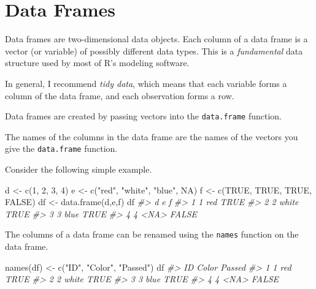 \documentclass[
]{article}
\newenvironment{Shaded}{\begin{snugshade}}{\end{snugshade}}
\newcommand{\CommentTok}[1]{\textcolor[rgb]{0.56,0.35,0.01}{\textit{#1}}}
\newcommand{\ConstantTok}[1]{\textcolor[rgb]{0.00,0.00,0.00}{#1}}
\newcommand{\DecValTok}[1]{\textcolor[rgb]{0.00,0.00,0.81}{#1}}
\newcommand{\FunctionTok}[1]{\textcolor[rgb]{0.00,0.00,0.00}{#1}}
\newcommand{\NormalTok}[1]{#1}
\newcommand{\OtherTok}[1]{\textcolor[rgb]{0.56,0.35,0.01}{#1}}
\newcommand{\StringTok}[1]{\textcolor[rgb]{0.31,0.60,0.02}{#1}}
\begin{document}
\hypertarget{data-frames}{%
\section{Data Frames}\label{data-frames}}

Data frames are two-dimensional data objects. Each column of a data
frame is a vector (or variable) of possibly different data types. This
is a \emph{fundamental} data structure used by most of R's modeling
software.

In general, I recommend \emph{tidy data}, which means that each variable
forms a column of the data frame, and each observation forms a row.

Data frames are created by passing vectors into the \texttt{data.frame}
function.

The names of the columns in the data frame are the names of the vectors
you give the \texttt{data.frame} function.

Consider the following simple example.

\begin{Shaded}
\begin{Highlighting}[]
\NormalTok{d }\OtherTok{\textless{}{-}} \FunctionTok{c}\NormalTok{(}\DecValTok{1}\NormalTok{, }\DecValTok{2}\NormalTok{, }\DecValTok{3}\NormalTok{, }\DecValTok{4}\NormalTok{)}
\NormalTok{e }\OtherTok{\textless{}{-}} \FunctionTok{c}\NormalTok{(}\StringTok{"red"}\NormalTok{, }\StringTok{"white"}\NormalTok{, }\StringTok{"blue"}\NormalTok{, }\ConstantTok{NA}\NormalTok{)}
\NormalTok{f }\OtherTok{\textless{}{-}} \FunctionTok{c}\NormalTok{(}\ConstantTok{TRUE}\NormalTok{, }\ConstantTok{TRUE}\NormalTok{, }\ConstantTok{TRUE}\NormalTok{, }\ConstantTok{FALSE}\NormalTok{)}
\NormalTok{df }\OtherTok{\textless{}{-}} \FunctionTok{data.frame}\NormalTok{(d,e,f)}
\NormalTok{df}
\CommentTok{\#\textgreater{}   d     e     f}
\CommentTok{\#\textgreater{} 1 1   red  TRUE}
\CommentTok{\#\textgreater{} 2 2 white  TRUE}
\CommentTok{\#\textgreater{} 3 3  blue  TRUE}
\CommentTok{\#\textgreater{} 4 4  \textless{}NA\textgreater{} FALSE}
\end{Highlighting}
\end{Shaded}

The columns of a data frame can be renamed using the \texttt{names}
function on the data frame.

\begin{Shaded}
\begin{Highlighting}[]
\FunctionTok{names}\NormalTok{(df) }\OtherTok{\textless{}{-}} \FunctionTok{c}\NormalTok{(}\StringTok{"ID"}\NormalTok{, }\StringTok{"Color"}\NormalTok{, }\StringTok{"Passed"}\NormalTok{)}
\NormalTok{df}
\CommentTok{\#\textgreater{}   ID Color Passed}
\CommentTok{\#\textgreater{} 1  1   red   TRUE}
\CommentTok{\#\textgreater{} 2  2 white   TRUE}
\CommentTok{\#\textgreater{} 3  3  blue   TRUE}
\CommentTok{\#\textgreater{} 4  4  \textless{}NA\textgreater{}  FALSE}
\end{Highlighting}
\end{Shaded}
\end{document}

